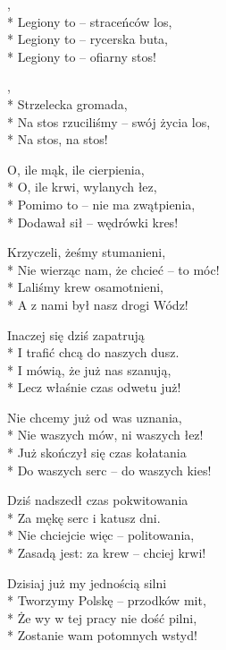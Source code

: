 \begin{lyrics}[longestline={Na stos rzuciliśmy -- swój życia los,}]

,\\*
Legiony to -- straceńców los,\\*
Legiony to -- rycerska buta,\\*
Legiony to -- ofiarny stos!

\begin{chorus}
,\\*
Strzelecka gromada,\\*
Na stos rzuciliśmy -- swój życia los,\\*
Na stos, na stos!
\end{chorus}

O, ile mąk, ile cierpienia,\\*
O, ile krwi, wylanych łez,\\*
Pomimo to -- nie ma zwątpienia,\\*
Dodawał sił -- wędrówki kres!

\chorusref

Krzyczeli, żeśmy stumanieni,\\*
Nie wierząc nam, że chcieć -- to móc!\\*
Laliśmy krew osamotnieni,\\*
A z nami był nasz drogi Wódz!

\chorusref

Inaczej się dziś zapatrują\\*
I trafić chcą do naszych dusz.\\*
I mówią, że już nas szanują,\\*
Lecz właśnie czas odwetu już!

\chorusref

Nie chcemy już od was uznania,\\*
Nie waszych mów, ni waszych łez!\\*
Już skończył się czas kołatania\\*
Do waszych serc -- do waszych kies!

\chorusref

Dziś nadszedł czas pokwitowania\\*
Za mękę serc i katusz dni.\\*
Nie chciejcie więc -- politowania,\\*
Zasadą jest: za krew -- chciej krwi!

\chorusref

Dzisiaj już my jednością silni\\*
Tworzymy Polskę -- przodków mit,\\*
Że wy w tej pracy nie dość pilni,\\*
Zostanie wam potomnych wstyd!


\end{lyrics}
